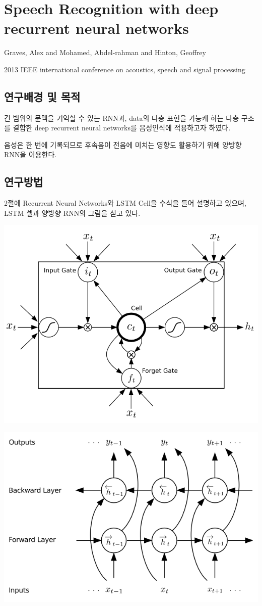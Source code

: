 \documentclass[ %
    a4paper,    %
    amsmath,    %
    itemph,     %
11pt]{oblivoir}     %
\begin{document}
\section{Speech Recognition with deep recurrent neural networks\cite{graves2013}}

\begin{description}\tightlist
\item[저자] Graves, Alex and Mohamed, Abdel-rahman and Hinton, Geoffrey
\item[학술지] 2013 IEEE international conference on acoustics, speech and signal processing
\end{description}

\subsection{연구배경 및 목적}
긴 범위의 문맥을 기억할 수 있는 RNN과, data의 다층 표현을 가능케 하는 다층 구조를 결합한 deep recurrent neural networks를 음성인식에 적용하고자 하였다.

음성은 한 번에 기록되므로 후속음이 전음에 미치는 영향도 활용하기 위해 양방향 RNN을 이용한다. 

\subsection{연구방법}
2절에 Recurrent Neural Networks와 LSTM Cell을 수식을 들어 설명하고 있으며, 
LSTM 셀과 양방향 RNN의 그림을 싣고 있다.

\hfil\includegraphics[width=.7\textwidth]{lstm2.png}\hfil

\hfil\includegraphics[width=.7\textwidth]{bi-rnn.png}\hfil
\end{document}
